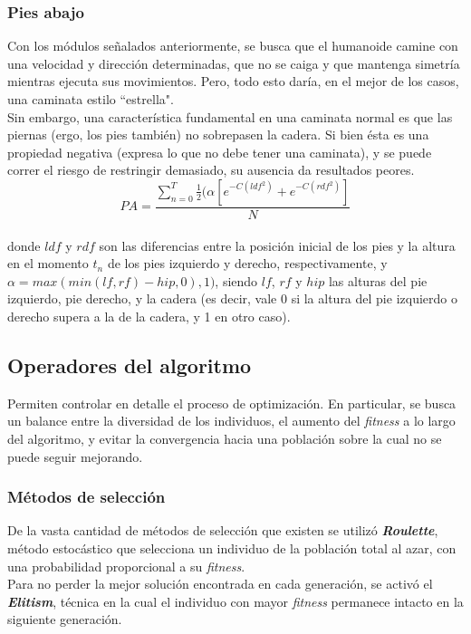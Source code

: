 \documentclass{article}
\begin{document}
\subsubsection{Pies abajo}
\label{piesabajo}
Con los m\'odulos se\~nalados anteriormente, se busca que el humanoide camine con una velocidad y direcci\'on determinadas, que no se caiga y que mantenga simetr\'ia mientras ejecuta sus movimientos. Pero, todo esto dar\'ia, en el mejor de los casos, una caminata estilo ``estrella". \\
Sin embargo, una caracter\'istica fundamental en una caminata normal es que las piernas (ergo, los pies tambi\'en) no sobrepasen la cadera. Si bien \'esta es una propiedad negativa (expresa lo que no debe tener una caminata), y se puede correr el riesgo de restringir demasiado, su ausencia da resultados peores.
\begin{equation}
 PA = \frac{\sum_{n=0}^{T} { \frac{1}{2} ( \alpha  [e^{-C( ldf ^2) } + e^{-C( rdf ^2) }]  } } {N}
\end{equation}
\\ donde $ldf $ y $rdf $ son las diferencias entre la posici\'on inicial de los pies y la altura en el momento $t_{n}$ de los pies izquierdo y derecho, respectivamente, y $\alpha = max(min(lf,rf)-hip,0),1)$, siendo $lf$, $rf$ y $hip$ las alturas del pie izquierdo, pie derecho, y la cadera (es decir, vale 0 si la altura del pie izquierdo o derecho supera a la de la cadera, y 1 en otro caso).\\


\subsection{Operadores del algoritmo}
Permiten controlar en detalle el proceso de optimizaci\'on. En particular, se busca un balance entre la diversidad de los individuos, el aumento del \textit{fitness} a lo largo del algoritmo, y evitar la convergencia hacia una poblaci\'on sobre la cual no se puede seguir mejorando.

\subsubsection{M\'etodos de selecci\'on}
\label{metodos de seleccion}

De la vasta cantidad de m\'etodos de selecci\'on que existen se utiliz\'o \textbf{\textit{Roulette}}, m\'etodo estoc\'astico que selecciona un individuo de la poblaci\'on total al azar, con una probabilidad proporcional a su \textit{fitness}.\\
Para no perder la mejor soluci\'on encontrada en cada generaci\'on, se activ\'o el \textbf{\textit{Elitism}}, t\'ecnica en la cual el individuo con mayor \textit{fitness} permanece intacto en la siguiente generaci\'on.
\end{document}
